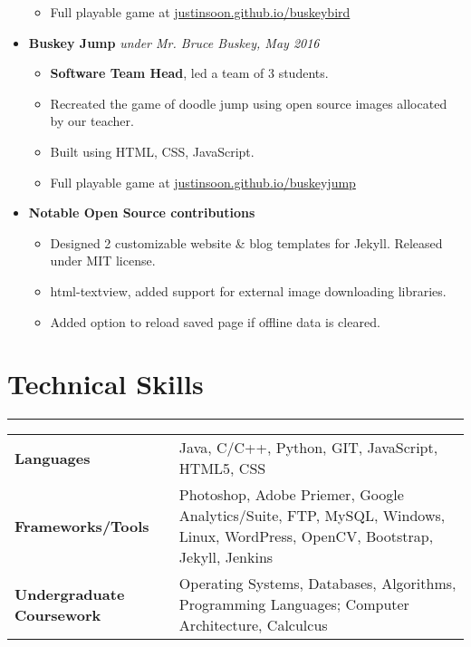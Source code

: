 \documentclass[a4paper]{article}
\begin{document}
\begin{itemize}
\begin{itemize}
		\item Full playable game at \href{http://justinsoon.github.io/BuskeyBird/}{justinsoon.github.io/buskeybird}
	      \end{itemize}
	\item
	      \textbf{Buskey Jump}
	      \hfill \textit{under Mr. Bruce Buskey, May 2016}
	      \begin{itemize}
		\vspace{-2mm} \setlength\itemsep{-0.7mm}
		\item \textbf{Software Team Head}, led a team of 3 students.
		\item Recreated the game of doodle jump using open source images allocated by our teacher.
		\item Built using HTML, CSS, JavaScript.
		\item Full playable game at \href{https://justinsoon.github.io/buskeyjump/}{justinsoon.github.io/buskeyjump}
	      \end{itemize}
	\item
	      \textbf{Notable Open Source contributions}
	      \begin{itemize}
	      	\vspace{-2mm} \setlength\itemsep{-0.7mm}
	      	\item Designed 2 customizable website \& blog templates for Jekyll. Released under MIT license.
	      	\item html-textview, added support for external image downloading libraries.
	      	\item Added option to reload saved page if offline data is cleared.
	      \end{itemize}
\end{itemize}

\section*{Technical Skills}
\hrule
\vspace{3mm}
\begin{tabular}{@{}m{40mm}m{130mm}@{}}
	\textbf{\textrm{Languages}}        & Java, C/C++, Python, GIT, JavaScript, HTML5, CSS\\
	\textbf{\textrm{Frameworks/Tools}} & Photoshop, Adobe Priemer, Google Analytics/Suite, FTP, MySQL, Windows, Linux, WordPress, OpenCV, Bootstrap, Jekyll, Jenkins\\
	\textbf{\textrm{Undergraduate Coursework}} & Operating Systems, Databases, Algorithms, Programming Languages; Computer Architecture, Calculcus\\
\end{tabular}
\end{document}
